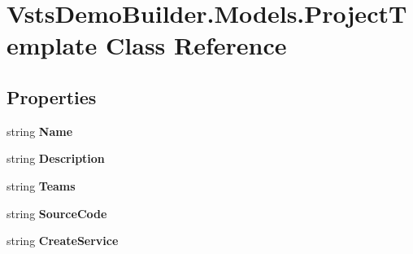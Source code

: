 \hypertarget{class_vsts_demo_builder_1_1_models_1_1_project_template}{}\section{Vsts\+Demo\+Builder.\+Models.\+Project\+Template Class Reference}
\label{class_vsts_demo_builder_1_1_models_1_1_project_template}
\subsection*{Properties}
\begin{DoxyCompactItemize}
\item 
\mbox{\label{class_vsts_demo_builder_1_1_models_1_1_project_template_aed53eb7d47aa4378d2f4ca8f56a9018e}} 
string {\bfseries Name}
\item 
\mbox{\label{class_vsts_demo_builder_1_1_models_1_1_project_template_a7050077555157d7ac6c3fba1d25fefcb}} 
string {\bfseries Description}
\item 
\mbox{\label{class_vsts_demo_builder_1_1_models_1_1_project_template_af3a7dff5c70f1cf3d3279e98666f4fd2}} 
string {\bfseries Teams}
\item 
\mbox{\label{class_vsts_demo_builder_1_1_models_1_1_project_template_a039d8579ab74e3ba91f59e30d52eaf8f}} 
string {\bfseries Source\+Code}
\item 
\mbox{\label{class_vsts_demo_builder_1_1_models_1_1_project_template_a6f2971a6346acc9cd2ee2f3e6da0065c}} 
string {\bfseries Create\+Service}

\end{DoxyCompactItemize}
